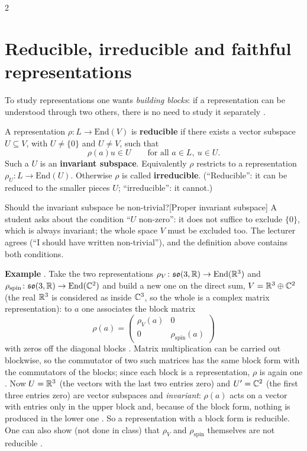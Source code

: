 \begin{paracol}{2}
\section{Reducible, irreducible and faithful representations}\label{sec:rp-irred}

To study representations one wants \emph{building blocks}: if a representation can be understood through two others, there is no need to study it separately .
\begin{definition}\label{def:rp-irred}
A representation $\rho\colon L\to\mathrm{End}(V)$ is \textbf{reducible} if there exists a vector subspace $U\subseteq V$, with $U\neq\{0\}$ and $U\neq V$, such that
\[
  \rho(a)u\in U\qquad\text{for all }a\in L,\ u\in U .
\]
Such a $U$ is an \textbf{invariant subspace}. Equivalently $\rho$ restricts to a representation $\rho_U\colon L\to\mathrm{End}(U)$. Otherwise $\rho$ is called \textbf{irreducible}. (``Reducible'': it can be reduced to the smaller pieces $U$; ``irreducible'': it cannot.)     
\end{definition}
\begin{answer}{Should the invariant subspace be non-trivial?}[Proper invariant subspace]
A student asks about the condition ``$U$ non-zero'': it does not suffice to exclude $\{0\}$, which is always invariant; the whole space $V$ must be excluded too. The lecturer agrees (``I should have written non-trivial''), and the definition above contains both conditions. 
\end{answer}
\textbf{Example} . Take the two representations $\rho_V\colon\mathfrak{so}(3,\mathbb{R})\to\mathrm{End}(\mathbb{R}^3)$ and $\rho_{\mathrm{spin}}\colon\mathfrak{so}(3,\mathbb{R})\to\mathrm{End}(\mathbb{C}^2)$ and build a new one on the direct sum, $V=\mathbb{R}^3\oplus\mathbb{C}^2$ (the real $\mathbb{R}^3$ is considered as inside $\mathbb{C}^3$, so the whole is a complex matrix representation): to $a$ one associates the block matrix
\[
  \rho(a)=\begin{pmatrix}\rho_V(a)&0\\0&\rho_{\mathrm{spin}}(a)\end{pmatrix}
\]
with zeros off the diagonal blocks  . Matrix multiplication can be carried out blockwise, so the commutator of two such matrices has the same block form with the commutators of the blocks; since each block is a representation, $\rho$ is again one  . Now $U=\mathbb{R}^3$ (the vectors with the last two entries zero) and $U'=\mathbb{C}^2$ (the first three entries zero) are vector subspaces and \emph{invariant}: $\rho(a)$ acts on a vector with entries only in the upper block and, because of the block form, nothing is produced in the lower one  . So a representation with a block form is reducible. One can also show (not done in class) that $\rho_V$ and $\rho_{\mathrm{spin}}$ themselves are not reducible .

\end{paracol}
